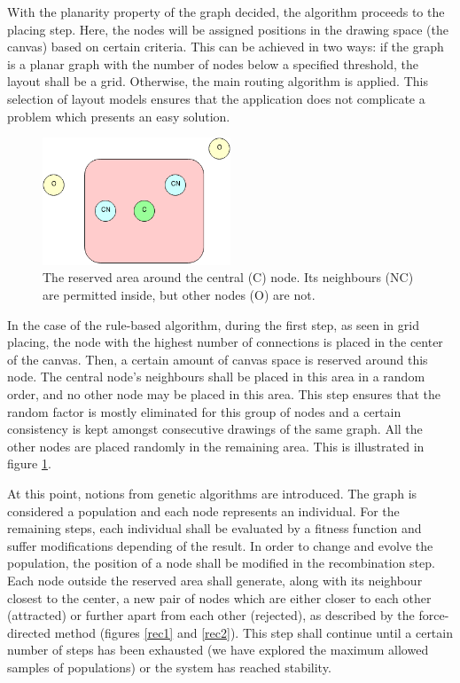With the planarity property of the graph decided, the algorithm proceeds to the placing step. Here, the nodes will be assigned positions in the 
drawing space (the canvas) based on certain criteria. This can be achieved in two ways: if the graph is a planar graph with the number of nodes 
below a specified threshold, the layout shall be a grid. Otherwise, the main routing algorithm is applied. This selection of layout models ensures 
that the application does not complicate a problem which presents an easy solution.

\begin{figure}[ht] \centering
\includegraphics[width=0.5\textwidth]{img/algdesing/centralnode.png}
\caption{The reserved area around the central (C) node. Its neighbours (NC) are permitted inside, but other nodes (O) are not. \label{central}} \end{figure}

In the case of the rule-based algorithm, during the first step, as seen in grid placing, the node with the highest number of connections is 
placed in the center of the canvas. Then, a certain amount of canvas space is reserved around this node. The central node's neighbours 
shall be placed in this area in a random order, and no other node may be placed in this area. This step ensures that the random factor is mostly eliminated 
 for this group of nodes and a certain consistency is kept amongst consecutive drawings of the same graph. All the other nodes are placed randomly in the remaining area.
This is illustrated in figure \ref{central}.

At this point, notions from genetic algorithms are introduced. The graph is considered a population and each node represents an individual. For the 
remaining steps, each individual shall be evaluated by a fitness function and suffer modifications depending of the result. In order to change and evolve 
the population, the position of a node shall be modified in the recombination step. Each node outside the reserved area shall generate, along with its neighbour closest to 
the center, a new pair of nodes which are either closer to each other (attracted) or further apart from each other (rejected), as described by the force-directed method (figures \ref{rec1} and \ref{rec2}). This step shall 
continue until a certain number of steps has been exhausted (we have explored the maximum allowed samples of populations) or the system has reached stability.

